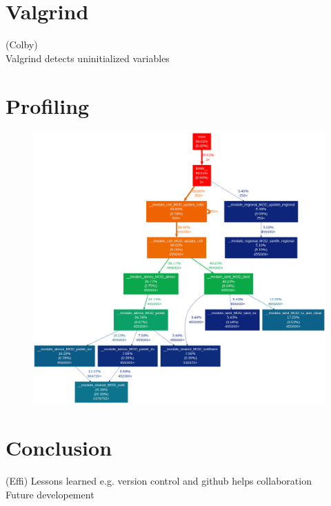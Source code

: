 \documentclass[pdftex,12pt,a4paper]{article}
\begin{document}
\section{Valgrind}
{(Colby)}
{\\ Valgrind detects uninitialized variables}

\section{Profiling}

\begin{figure}[h]
	\includegraphics[width=5.5in]{Figures/CallGraph.png}
	\label{Profiling1}
	\caption{}
\end{figure}

\section{Conclusion}
{(Effi)}
{Lessons learned e.g. version control and github helps collaboration}
{ \\ Future developement}
\end{document}
